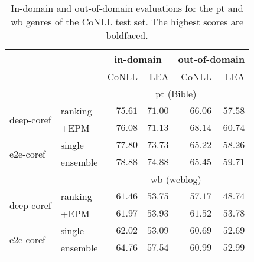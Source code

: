 %
\begin{table}[htbp]
    \begin{center}\footnotesize
    \begin{tabular}{@{}l@{\hskip3pt}|@{\hskip3pt}l@{\hskip3pt}|@{\hskip3pt}r@{\hskip3pt}|@{\hskip3pt}r@{\hskip3pt}||@{\hskip3pt}r@{\hskip3pt}|@{\hskip3pt}r@{}}
         \multicolumn{2}{c}{} & \multicolumn{2}{c}{in-domain} & \multicolumn{2}{c}{out-of-domain} \\ \hline
	 \multicolumn{2}{c}{} & CoNLL & LEA & CoNLL & LEA \\ \hline
          \multicolumn{2}{c}{} & \multicolumn{4}{c}{{pt (Bible)} } \\ \hline
	 \multirow{2}{*}{{ deep-coref}}
     &ranking & $75.61$ & $71.00$ & $66.06$ & $57.58$  \\ 
     & +EPM & $76.08$ & $71.13$ & $\boldsymbol{68.14}$ & $\boldsymbol{60.74}$ \\ \hline
     \multirow{2}{*}{{ e2e-coref}} 
     & single& ${77.80}$ & ${73.73}$ & $65.22$ & $58.26$\\ 
	 & ensemble & $\boldsymbol{78.88}$ & $\boldsymbol{74.88}$ & $65.45$ & $59.71$\\
	 \hline 
     \hline
     \multicolumn{2}{c}{} & \multicolumn{4}{c}{{wb (weblog)} } \\ \hline
	 \multirow{2}{*}{{ deep-coref}}
     &ranking & $61.46$ & $53.75$ & $57.17$ & $48.74$ \\ 
     &+EPM & $61.97$ & ${53.93}$ & $\boldsymbol{61.52}$ & $\boldsymbol{53.78}$ \\ \hline
     \multirow{2}{*}{{ e2e-coref}}
     &single & ${62.02}$ & $53.09$ & $60.69$ & $52.69$\\ 
	 &ensemble & $\boldsymbol{64.76}$ & $\boldsymbol{57.54}$ & $60.99$ & $52.99$\\
	 
     \hline
    \end{tabular}
    \end{center}
    \caption{In-domain and out-of-domain evaluations for the pt and wb genres of the CoNLL test set.
    The highest scores are boldfaced.
    }
    \label{tab:cross_genre_enhanced_1}
\end{table}
